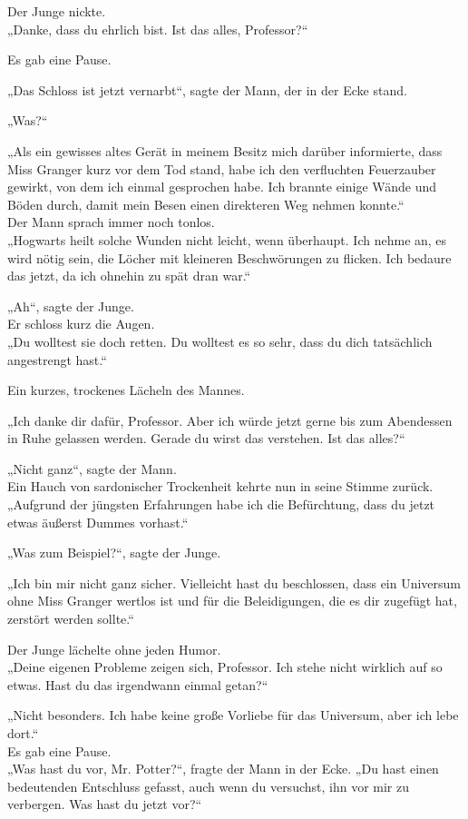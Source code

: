 {Der Junge nickte.\\ „Danke, dass du ehrlich bist. Ist das alles, Professor?“

Es gab eine Pause.

„Das Schloss ist jetzt vernarbt“, sagte der Mann, der in der Ecke stand.

„Was?“

„Als ein gewisses altes Gerät in meinem Besitz mich darüber informierte, dass Miss Granger kurz vor dem Tod stand, habe ich den verfluchten Feuerzauber gewirkt, von dem ich einmal gesprochen habe. Ich brannte einige Wände und Böden durch, damit mein Besen einen direkteren Weg nehmen konnte.“\\ Der Mann sprach immer noch tonlos.\\ „Hogwarts heilt solche Wunden nicht leicht, wenn überhaupt. Ich nehme an, es wird nötig sein, die Löcher mit kleineren Beschwörungen zu flicken. Ich bedaure das jetzt, da ich ohnehin zu spät dran war.“

„Ah“, sagte der Junge.\\ Er schloss kurz die Augen.\\ „Du wolltest sie doch retten. Du wolltest es so sehr, dass du dich tatsächlich angestrengt hast.“

Ein kurzes, trockenes Lächeln des Mannes.

„Ich danke dir dafür, Professor. Aber ich würde jetzt gerne bis zum Abendessen in Ruhe gelassen werden. Gerade du wirst das verstehen. Ist das alles?“

„Nicht ganz“, sagte der Mann.\\ Ein Hauch von sardonischer Trockenheit kehrte nun in seine Stimme zurück.\\ „Aufgrund der jüngsten Erfahrungen habe ich die Befürchtung, dass du jetzt etwas äußerst Dummes vorhast.“

„Was zum Beispiel?“, sagte der Junge.

„Ich bin mir nicht ganz sicher. Vielleicht hast du beschlossen, dass ein Universum ohne Miss Granger wertlos ist und für die Beleidigungen, die es dir zugefügt hat, zerstört werden sollte.“

Der Junge lächelte ohne jeden Humor.\\ „Deine eigenen Probleme zeigen sich, Professor. Ich stehe nicht wirklich auf so etwas. Hast du das irgendwann einmal getan?“

„Nicht besonders. Ich habe keine große Vorliebe für das Universum, aber ich lebe dort.“\\ Es gab eine Pause.\\ „Was hast du vor, Mr. Potter?“, fragte der Mann in der Ecke. „Du hast einen bedeutenden Entschluss gefasst, auch wenn du versuchst, ihn vor mir zu verbergen. Was hast du jetzt vor?“

}
